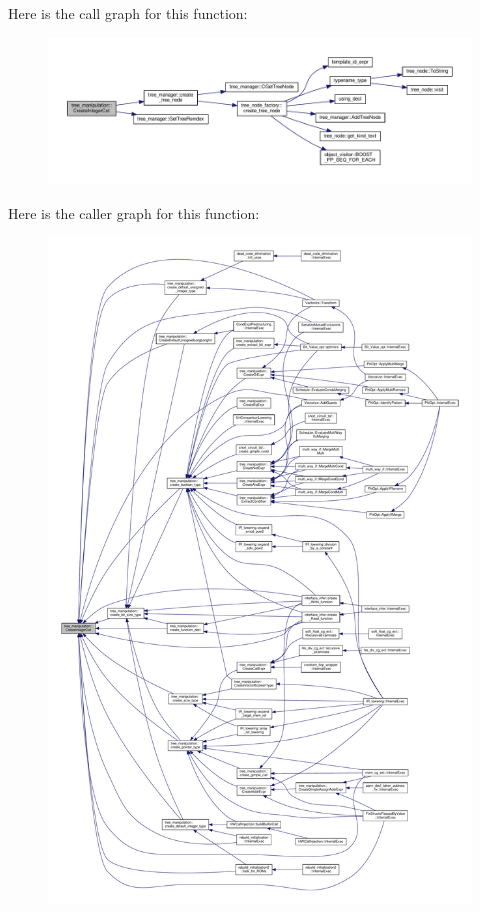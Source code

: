 Here is the call graph for this function\+:
\nopagebreak
\begin{figure}[H]
\begin{center}
\leavevmode
\includegraphics[width=350pt]{d0/d99/classtree__manipulation_ac77ee11b047981b9f464694c96e22238_cgraph}
\end{center}
\end{figure}
Here is the caller graph for this function\+:
\nopagebreak
\begin{figure}[H]
\begin{center}
\leavevmode
\includegraphics[width=350pt]{d0/d99/classtree__manipulation_ac77ee11b047981b9f464694c96e22238_icgraph}
\end{center}
\end{figure}
\mbox{\label{classtree__manipulation_a115aa311fc7b9f2709dbebd0ac7087f8}} 
